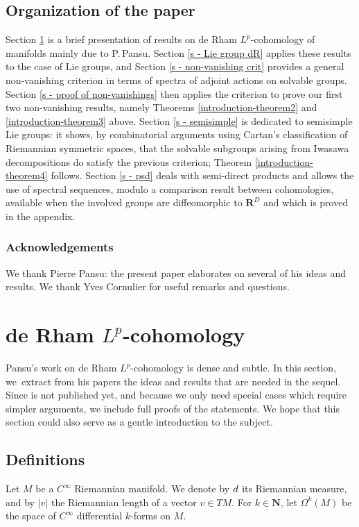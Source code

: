 \documentclass[JEP,XML,SOM,Unicode,published]{cedram}
\newcommand{\NoChangel}[1]{%
\expandafter\let\csname old\string#1\endcsname=#1
\let#1=\relax
\newcommand{#1}{\mathcode`l="716C\csname old\string#1\endcsname\mathcode`l="7160 }%
}
\newcommand{\NN}{\mathbf{N}}
\newcommand{\RR}{\mathbf{R}}
\theoremstyle{plain}
\theoremstyle{remark}
\theoremstyle{definition}
\DeclareMathOperator{\vol}{vol}\NoChangel{\vol}
\begin{document}
\subsection*{Organization of the paper}
Section \ref{s - dR} is a brief presentation of results on de Rham $L^p$\nobreakdash-cohomology of manifolds mainly due to P.\,Pansu.
Section \ref{s - Lie group dR} applies these results to the case of Lie groups, and Section \ref{s - non-vanishing crit} provides a general non-vanishing criterion in terms of spectra of adjoint actions on solvable groups.
Section \ref{s - proof of non-vanishings} then applies the criterion to prove our first two non-vanishing results, namely Theorems \ref{introduction-theorem2} and \ref{introduction-theorem3} above.
Section \ref{s - semisimple} is dedicated to semisimple Lie groups: it shows, by combinatorial arguments using Cartan's classification of Riemannian symmetric spaces, that the solvable subgroups arising from Iwasawa decompositions do satisfy the previous criterion; Theorem \ref{introduction-theorem4} follows.
Section \ref{s - psd} deals with semi-direct products and allows the use of spectral sequences, modulo a comparison result between cohomologies, available when the involved groups are diffeomorphic to $\RR^D$ and which is proved in the appendix.

\subsubsection*{Acknowledgements}
We thank Pierre Pansu: the present paper elaborates on several of his ideas and results.
We thank Yves Cornulier for useful remarks and questions.


\section{de Rham \texorpdfstring{$L^p$}{Lp}-cohomology}
\label{s - dR}

Pansu's work on de Rham $L^p$\nobreakdash-cohomology is dense and subtle.
In this section, we~extract from his papers \cite{P1, Pa09} the ideas and results that are needed in the sequel.
Since \cite{Pa09} is not published yet, and because we only need special cases which require simpler arguments, we include full
proofs of the statements.
We hope that this section could also serve as a gentle introduction to the subject.

\subsection{Definitions}
Let $M$ be a $C^\infty$ Riemannian manifold. We denote by $d\vol$ its Riemannian measure, and by $\vert v \vert$ the Riemannian length of a vector $v \in TM$.
For $k \in \NN$, let $\Omega^k(M)$ be the space of $C^\infty$ differential $k$-forms on $M$.
\end{document}
